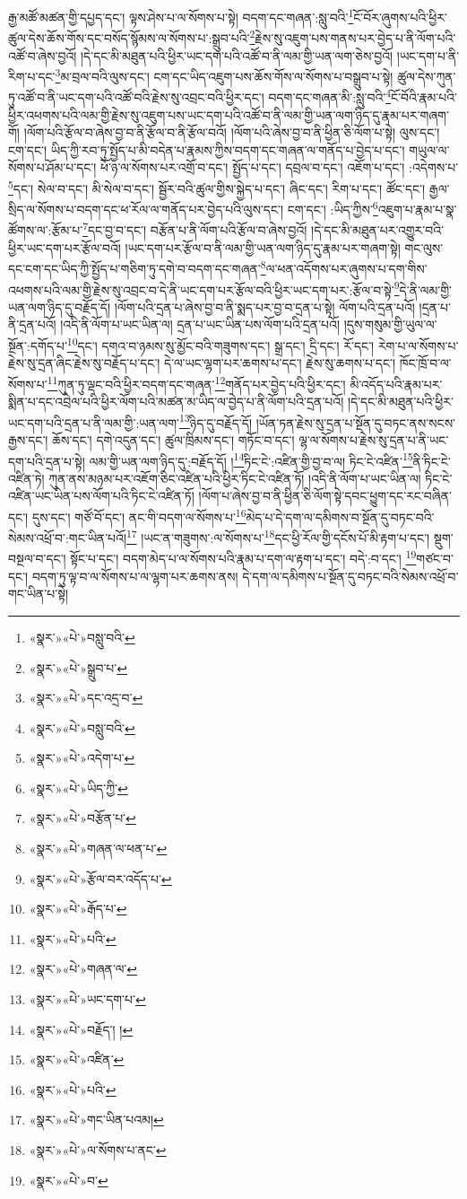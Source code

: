 རྒྱ་མཚོ་མཚན་གྱི་དཔྱད་དང་། ལྟས་ཤེས་པ་ལ་སོགས་པ་སྟེ། བདག་དང་གཞན་:སླུ་བའི་\footnote{«སྣར་»«པེ་»བསླུ་བའི་}ངོ་བོར་ཞུགས་པའི་ཕྱིར་ཚུལ་དེས་ཆོས་གོས་དང་བསོད་སྙོམས་ལ་སོགས་པ་:སྒྲུབ་པའི་\footnote{«སྣར་»«པེ་»སྒྲུབ་པ་}རྗེས་སུ་འཇུག་པས་གནས་པར་བྱེད་པ་ནི་ལོག་པའི་འཚོ་བ་ཞེས་བྱའོ། །དེ་དང་མི་མཐུན་པའི་ཕྱིར་ཡང་དག་པའི་འཚོ་བ་ནི་ལམ་གྱི་ཡན་ལག་ཅེས་བྱའོ། །ཡང་དག་པ་ནི་རིག་པ་དང་\footnote{«སྣར་»«པེ་»དང་འདྲ་བ་}མ་བྲལ་བའི་ལུས་དང་། ངག་དང་ཡིད་འཇུག་པས་ཆོས་གོས་ལ་སོགས་པ་བསྒྲུབ་པ་སྟེ། ཚུལ་དེས་ཀུན་ཏུ་འཚོ་བ་ནི་ཡང་དག་པའི་འཚོ་བའི་རྗེས་སུ་འབྲང་བའི་ཕྱིར་དང་། བདག་དང་གཞན་མི་:སླུ་བའི་\footnote{«སྣར་»«པེ་»བསླུ་བའི་}ངོ་བོའི་རྣམ་པའི་ཕྱིར་འཕགས་པའི་ལམ་གྱི་རྗེས་སུ་འཇུག་པས་ཡང་དག་པའི་འཚོ་བ་ནི་ལམ་གྱི་ཡན་ལག་ཉིད་དུ་རྣམ་པར་གཞག་གོ། །ལོག་པའི་རྩོལ་བ་ཞེས་བྱ་བ་ནི་རྩོལ་བ་ནི་རྩོལ་བའོ། །ལོག་པའི་ཞེས་བྱ་བ་ནི་ཕྱིན་ཅི་ལོག་པ་སྟེ། ལུས་དང་། ངག་དང་། ཡིད་ཀྱི་རབ་ཏུ་སྤྱོད་པ་མི་བདེན་པ་རྣམས་ཀྱིས་བདག་དང་གཞན་ལ་གནོད་པ་བྱེད་པ་དང་། གཡུལ་ལ་སོགས་པ་ཤོམ་པ་དང་། ཕོ་ཉ་ལ་སོགས་པར་འགྲོ་བ་དང་། སྤྱོད་པ་དང་། དབྲལ་བ་དང་། འཇོག་པ་དང་། :འདེགས་པ་\footnote{«སྣར་»«པེ་»འདེག་པ་}དང་། སེལ་བ་དང་། མི་སེལ་བ་དང་། སྦྱོར་བའི་ཚུལ་གྱིས་སྐྱེད་པ་དང་། ཞིང་དང་། རིག་པ་དང་། ཚོང་དང་། རྒྱལ་སྲིད་ལ་སོགས་པ་བདག་དང་ཕ་རོལ་ལ་གནོད་པར་བྱེད་པའི་ལུས་དང་། ངག་དང་། :ཡིད་ཀྱིས་\footnote{«སྣར་»«པེ་»ཡིད་ཀྱི་}འཇུག་པ་རྣམ་པ་སྣ་ཚོགས་ལ་:རྩོམ་པ་\footnote{«སྣར་»«པེ་»བརྩོན་པ་}དང་བྱ་བ་དང་། བརྩོན་པ་ནི་ལོག་པའི་རྩོལ་བ་ཞེས་བྱའོ། །དེ་དང་མི་མཐུན་པར་འགྱུར་བའི་ཕྱིར་ཡང་དག་པར་རྩོལ་བའོ། །ཡང་དག་པར་རྩོལ་བ་ནི་ལམ་གྱི་ཡན་ལག་ཉིད་དུ་རྣམ་པར་གཞག་སྟེ། གང་ལུས་དང་ངག་དང་ཡིད་ཀྱི་སྤྱོད་པ་གཅིག་ཏུ་དགེ་བ་བདག་དང་གཞན་\footnote{«སྣར་»«པེ་»གཞན་ལ་ཕན་པ་}ལ་ཕན་འདོགས་པར་ཞུགས་པ་དག་གིས་འཕགས་པའི་ལམ་གྱི་རྗེས་སུ་འབྲང་བ་དེ་ནི་ཡང་དག་པར་རྩོལ་བའི་ཕྱིར་ཡང་དག་པར་:རྩོལ་བ་སྟེ་\footnote{«སྣར་»«པེ་»རྩོལ་བར་འདོད་པ་}དེ་ནི་ལམ་གྱི་ཡན་ལག་ཉིད་དུ་བརྗོད་དོ། །ལོག་པའི་དྲན་པ་ཞེས་བྱ་བ་ནི་སྨད་པར་བྱ་བ་དྲན་པ་སྟེ། ལོག་པའི་དྲན་པའོ། །དྲན་པ་ནི་དྲན་པའོ། །འདི་ནི་ལོག་པ་ཡང་ཡིན་ལ། དྲན་པ་ཡང་ཡིན་པས་ལོག་པའི་དྲན་པའོ། །དུས་གསུམ་གྱི་ཡུལ་ལ་སྔོན་:དགོད་པ་\footnote{«སྣར་»«པེ་»རྒོད་པ་}དང་། དགའ་བ་ཉམས་སུ་མྱོང་བའི་གཟུགས་དང་། སྒྲ་དང་། དྲི་དང་། རོ་དང་། རེག་པ་ལ་སོགས་པ་རྗེས་སུ་དྲན་ཞིང་རྗེས་སུ་བརྗོད་པ་དང་། དེ་ལ་ཡང་ལྷག་པར་ཆགས་པ་དང་། རྗེས་སུ་ཆགས་པ་དང་། ཁོང་ཁྲོ་བ་ལ་སོགས་པ་\footnote{«སྣར་»«པེ་»པའི་}ཀུན་ཏུ་ལྡང་བའི་ཕྱིར་བདག་དང་གཞན་\footnote{«སྣར་»«པེ་»གཞན་ལ་}གནོད་པར་བྱེད་པའི་ཕྱིར་དང་། མི་འདོད་པའི་རྣམ་པར་སྨིན་པ་དང་འབྲེལ་པའི་ཕྱིར་ལོག་པའི་མཚན་མ་ཡིད་ལ་བྱེད་པ་ནི་ལོག་པའི་དྲན་པའོ། །དེ་དང་མི་མཐུན་པའི་ཕྱིར་ཡང་དག་པའི་དྲན་པ་ནི་ལམ་གྱི་:ཡན་ལག་\footnote{«སྣར་»«པེ་»ཡང་དག་པ་}ཉིད་དུ་བརྗོད་དོ། །ཡོན་ཏན་རྗེས་སུ་དྲན་པ་སྔོན་དུ་བཏང་ནས་སངས་རྒྱས་དང་། ཆོས་དང་། དགེ་འདུན་དང་། ཚུལ་ཁྲིམས་དང་། གཏོང་བ་དང་། ལྷ་ལ་སོགས་པ་རྗེས་སུ་དྲན་པ་ནི་ཡང་དག་པའི་དྲན་པ་སྟེ། ལམ་གྱི་ཡན་ལག་ཉིད་དུ་:བརྗོད་དོ། །\footnote{«སྣར་»«པེ་»བརྗོད་། ། }ཏིང་ངེ་:འཛིན་གྱི་བྱ་བ་ལ། ཏིང་ངེ་འཛིན་\footnote{«སྣར་»«པེ་»འཛིན་}ནི་ཏིང་ངེ་འཛིན་ཏེ། ཀུན་ནས་མཉམ་པར་འཇོག་ཅིང་འཛིན་པའི་ཕྱིར་ཏིང་ངེ་འཛིན་ཏོ། །འདི་ནི་ལོག་པ་ཡང་ཡིན་ལ། ཏིང་ངེ་འཛིན་ཡང་ཡིན་པས་ལོག་པའི་ཏིང་ངེ་འཛིན་ཏོ། །ལོག་པ་ཞེས་བྱ་བ་ནི་ཕྱིན་ཅི་ལོག་སྟེ་དབང་ཕྱུག་དང་རང་བཞིན་དང་། དུས་དང་། གཙོ་བོ་དང་། ནང་གི་བདག་ལ་སོགས་པ་\footnote{«སྣར་»«པེ་»པའི་}མེད་པ་དེ་དག་ལ་དམིགས་བ་སྔོན་དུ་བཏང་བའི་སེམས་འཕྲོ་བ་:གང་ཡིན་པའོ།\footnote{«སྣར་»«པེ་»གང་ཡིན་པའམ།} །ཡང་ན་གཟུགས་:ལ་སོགས་པ་\footnote{«སྣར་»«པེ་»ལ་སོགས་པ་ནང་}དང་ཕྱི་རོལ་གྱི་དངོས་པོ་མི་རྟག་པ་དང་། སྡུག་བསྔལ་བ་དང་། སྟོང་པ་དང་། བདག་མེད་པ་ལ་སོགས་པའི་རྣམ་པ་དག་ལ་རྟག་པ་དང་། བདེ་:བ་དང་། \footnote{«སྣར་»«པེ་»བ་}གཙང་བ་དང་། བདག་ཏུ་ལྟ་བ་ལ་སོགས་པ་ལ་ལྷག་པར་ཆགས་ནས། དེ་དག་ལ་དམིགས་པ་སྔོན་དུ་བཏང་བའི་སེམས་འཕྲོ་བ་གང་ཡིན་པ་སྟེ། 